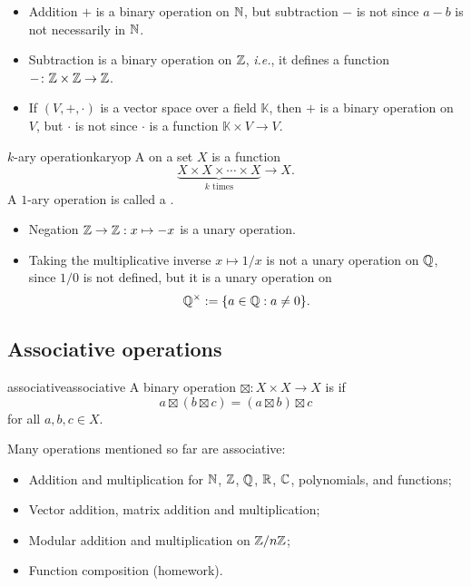 \documentclass[12pt,letterpaper]{report}
\begin{document}
\begin{ex}
  \begin{itemize}
    \item
    Addition $+$ is a binary operation on $\mathbb{N}$, but subtraction $-$ is not since $a - b$ is
    not necessarily in $\mathbb{N}$.
    \item
    Subtraction is a binary operation on $\mathbb{Z}$, \emph{i.e.}, it defines a function
    $- \colon \mathbb{Z} \times \mathbb{Z} \to \mathbb{Z}$.
    \item
    If $(V, +, \cdot)$ is a vector space over a field $\mathbb{K}$, then $+$ is a binary operation
    on $V$, but $\cdot$ is not since $\cdot$ is a function $\mathbb{K} \times V \to V$.
  \end{itemize}
\end{ex}

\begin{defn}{$k$-ary operation}{karyop}
  A  on a set $X$ is a function
  \[
    \underbrace{X \times X \times \cdots \times X}_{k \text{ times}} \to X.
  \]
  A $1$-ary operation is called a .
\end{defn}

\begin{ex}
  \begin{itemize}
    \item
    Negation $\mathbb{Z} \to \mathbb{Z} : x \mapsto -x$ is a unary operation.
    \item
    Taking the multiplicative inverse $x \mapsto 1/x$ is not a unary operation on $\mathbb{Q}$,
    since $1/0$ is not defined, but it is a unary operation on
    \[ \mathbb{Q}^\times := \{ a \in \mathbb{Q} : a \neq 0 \}. \]
  \end{itemize}
\end{ex}

\pagebreak
\subsection{Associative operations}

\begin{defn}{associative}{associative}
  A binary operation $\boxtimes \colon X \times X \to X$ is  if
  \[
    a \boxtimes (b \boxtimes c) = (a \boxtimes b) \boxtimes c
  \]
  for all $a, b, c \in X$.
\end{defn}

Many operations mentioned so far are associative:
\begin{itemize}
  \item
  Addition and multiplication for $\mathbb{N}$, $\mathbb{Z}$, $\mathbb{Q}$, $\mathbb{R}$,
  $\mathbb{C}$, polynomials, and functions;
  \item
  Vector addition, matrix addition and multiplication;
  \item
  Modular addition and multiplication on $\mathbb{Z}/{n}\mathbb{Z}$;
  \item
  Function composition (homework).
\end{itemize}
\end{document}
